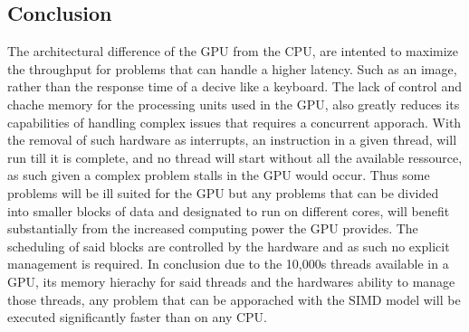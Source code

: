 \subsection{Conclusion} %
The architectural difference of the GPU from the CPU, are intented to maximize the throughput for problems that can handle a higher latency.
Such as an image, rather than the response time of a decive like a keyboard.
The lack of control and chache memory for the processing units used in the GPU, also greatly reduces its capabilities of handling complex issues that requires a concurrent apporach.
With the removal of such hardware as interrupts, an instruction in a given thread, will run till it is complete, and no thread will start without all the available ressource, as such given a complex problem stalls in the GPU would occur.
Thus some problems will be ill suited for the GPU but any problems that can be divided into smaller blocks of data and designated to run on different cores, will benefit substantially from the increased computing power the GPU provides.
The scheduling of said blocks are controlled by the hardware and as such no explicit management is required.
In conclusion due to the 10,000s threads available in a GPU, its memory hierachy for said threads and the hardwares ability to manage those threads, any problem that can be apporached with the SIMD model will be executed significantly faster than on any CPU.


